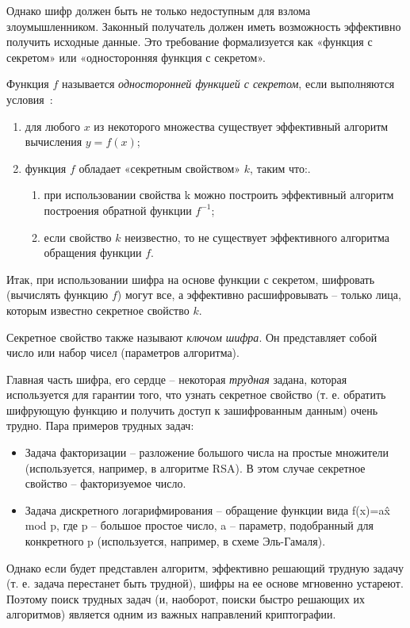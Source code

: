 Однако шифр должен быть не только недоступным для взлома злоумышленником. Законный получатель должен иметь возможность эффективно получить исходные данные. Это требование формализуется как «функция с секретом» или «односторонняя функция с секретом».

Функция $f$ называется \textit{односторонней функцией с секретом}, если выполняются условия~\cite{src12}:
\begin{enumerate}
	\item для любого $x$ из некоторого множества существует эффективный алгоритм вычисления $y=f(x)$;
	\item функция $f$ обладает «секретным свойством» $k$, таким что:.
	\begin{enumerate}
		\item при использовании свойства k можно построить эффективный алгоритм построения обратной функции $f^{-1}$;
		\item если свойство $k$ неизвестно, то не существует эффективного алгоритма обращения функции $f$.
	\end{enumerate}
\end{enumerate}

Итак, при использовании шифра на основе функции с секретом, шифровать (вычислять функцию $f$) могут все, а эффективно расшифровывать – только лица, которым известно секретное свойство $k$.

Секретное свойство также называют \textit{ключом шифра}. Он представляет собой число или набор чисел (параметров алгоритма).

Главная часть шифра, его сердце – некоторая \textit{трудная} задана, которая используется для гарантии того, что узнать секретное свойство (т. е. обратить шифрующую функцию и получить доступ к зашифрованным данным) очень трудно. Пара примеров трудных задач:
\begin{itemize}
	\item Задача факторизации – разложение большого числа на простые множители (используется, например, в алгоритме RSA). В этом случае секретное свойство – факторизуемое число.
	\item Задача дискретного логарифмирования – обращение функции вида f(x)=a\^x  mod p, где p – большое простое число, a – параметр, подобранный для конкретного p (используется, например, в схеме Эль-Гамаля).
\end{itemize}

Однако если будет представлен алгоритм, эффективно решающий трудную задачу (т. е. задача перестанет быть трудной), шифры на ее основе мгновенно устареют. Поэтому поиск трудных задач (и, наоборот, поиски быстро решающих их алгоритмов) является одним из важных направлений криптографии.

